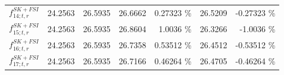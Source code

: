 \begin{table}
\begin{tabular}{| l | r | r | r  r | r  r |}
                                                         $f_{14; t, r}^{SK+FSI}$ &         24.2563 & 26.5935 & 26.6662 &         0.27323 \%  &         26.5209 &        -0.27323 \%  \\ 
                                                         $f_{15; t, r}^{SK+FSI}$ &         24.2563 & 26.5935 & 26.8604 &          1.0036 \%  &         26.3266 &         -1.0036 \%  \\ 
                                                         $f_{16; t, r}^{SK+FSI}$ &         24.2563 & 26.5935 & 26.7358 &         0.53512 \%  &         26.4512 &        -0.53512 \%  \\ 
                                                         $f_{17; t, r}^{SK+FSI}$ &         24.2563 & 26.5935 & 26.7166 &         0.46264 \%  &         26.4705 &        -0.46264 \%  \\ 

\end{tabular}
\end{table}
